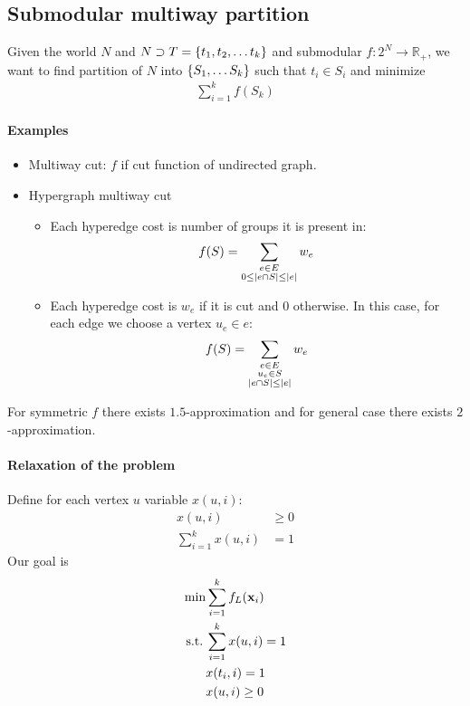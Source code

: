 \subsection{Submodular multiway partition}
Given the world $N$ and $N\supset T = \qty{t_1, t_2,\dots t_k}$ and submodular $f:2^N \to \mathbb{R}_+$, we want to find partition of $N$ into $\qty{S_1, \dots S_k}$ such that $t_i\in S_i$ and minimize
\begin{align}
\sum_{i=1}^k f(S_k)
\end{align}
\paragraph{Examples}
\begin{itemize}
	\item Multiway cut: $f$ if cut function of undirected graph. 
	\item Hypergraph multiway cut
	\begin{itemize}
		\item Each hyperedge cost is number of groups it is present in:
		\begin{align}
		f(S) = \sum_{\substack{e \in E\\0\leq\abs{e\cap S} \leq \abs{e}}} w_e
		\end{align}
		\item Each hyperedge cost is $w_e$ if it is cut and $0$ otherwise. In this case, for each edge we choose a vertex $u_e\in e$:
		\begin{align}
		f(S) = \sum_{\substack{e \in E\\u_e\in S\\\abs{e\cap S} \leq \abs{e}}} w_e
		\end{align}
	\end{itemize}
\end{itemize}

For symmetric $f$ there exists $1.5$-approximation and for general case there exists $2$-approximation.

\paragraph{Relaxation of the problem}
Define for each vertex $u$ variable $x(u,i)$:
\begin{align}
	x(u,i) &\geq 0\\
	\sum_{i=1}^k x(u,i) &= 1
\end{align}
Our goal is
\begin{align}
\min &\sum_{i=1}^k f_L(\vb{x}_i)\\
\text{s.t.} \: & \sum_{i=1}^k x(u,i) = 1\\
& x(t_i,i) = 1\\
& x(u,i) \geq 0
\end{align}

